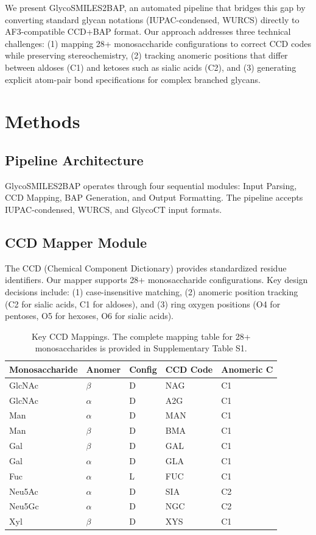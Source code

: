 \documentclass[11pt,a4paper]{article}
\begin{document}
We present GlycoSMILES2BAP, an automated pipeline that bridges this gap by converting standard glycan notations (IUPAC-condensed, WURCS) directly to AF3-compatible CCD+BAP format. Our approach addresses three technical challenges: (1) mapping 28+ monosaccharide configurations to correct CCD codes while preserving stereochemistry, (2) tracking anomeric positions that differ between aldoses (C1) and ketoses such as sialic acids (C2), and (3) generating explicit atom-pair bond specifications for complex branched glycans.

\section{Methods}

\subsection{Pipeline Architecture}

GlycoSMILES2BAP operates through four sequential modules: Input Parsing, CCD Mapping, BAP Generation, and Output Formatting. The pipeline accepts IUPAC-condensed, WURCS, and GlycoCT input formats.

\subsection{CCD Mapper Module}

The CCD (Chemical Component Dictionary) provides standardized residue identifiers. Our mapper supports 28+ monosaccharide configurations. Key design decisions include: (1) case-insensitive matching, (2) anomeric position tracking (C2 for sialic acids, C1 for aldoses), and (3) ring oxygen positions (O4 for pentoses, O5 for hexoses, O6 for sialic acids).

\begin{table}[h]
\centering
\caption{Key CCD Mappings. The complete mapping table for 28+ monosaccharides is provided in Supplementary Table S1.}
\begin{tabular}{lllll}
\toprule
Monosaccharide & Anomer & Config & CCD Code & Anomeric C \\
\midrule
GlcNAc & $\beta$ & D & NAG & C1 \\
GlcNAc & $\alpha$ & D & A2G & C1 \\
Man & $\alpha$ & D & MAN & C1 \\
Man & $\beta$ & D & BMA & C1 \\
Gal & $\beta$ & D & GAL & C1 \\
Gal & $\alpha$ & D & GLA & C1 \\
Fuc & $\alpha$ & L & FUC & C1 \\
Neu5Ac & $\alpha$ & D & SIA & C2 \\
Neu5Gc & $\alpha$ & D & NGC & C2 \\
Xyl & $\beta$ & D & XYS & C1 \\
\bottomrule
\end{tabular}
\end{table}
\end{document}
